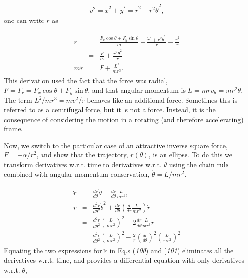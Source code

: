 \documentclass[letterpaper,10pt,english]{sphinxmanual}
\begin{document}
\begin{equation*}
\begin{split}
\begin{equation}
v^2=\dot{x}^2+\dot{y}^2=\dot{r}^2+r^2\dot{\theta}^2,
\label{_auto74} \tag{99}
\end{equation}
\end{split}
\end{equation*}
one can write \(\ddot{r}\) as




\begin{equation*}
\begin{split}
\begin{eqnarray}
\label{eq:radialeqofmotion2} \tag{100}
\ddot{r}&=&\frac{F_x\cos\theta+F_y\sin\theta}{m}+\frac{\dot{r}^2+r^2\dot{\theta}^2}{r}-\frac{\dot{r}^2}{r}\\
\nonumber
&=&\frac{F}{m}+\frac{r^2\dot{\theta}^2}{r}\\
\nonumber
m\ddot{r}&=&F+\frac{L^2}{mr^3}.
\end{eqnarray}
\end{split}
\end{equation*}
This derivation used the fact that the force was radial,
\(F=F_r=F_x\cos\theta+F_y\sin\theta\), and that angular momentum is
\(L=mrv_{\theta}=mr^2\dot{\theta}\). The term \(L^2/mr^3=mv^2/r\) behaves
like an additional force. Sometimes this is referred to as a
centrifugal force, but it is not a force. Instead, it is the
consequence of considering the motion in a rotating (and therefore
accelerating) frame.

Now, we switch to the particular case of an attractive inverse square
force, \(F=-\alpha/r^2\), and show that the trajectory, \(r(\theta)\), is
an ellipse. To do this we transform derivatives w.r.t. time to
derivatives w.r.t. \(\theta\) using the chain rule combined with angular
momentum conservation, \(\dot{\theta}=L/mr^2\).




\begin{equation*}
\begin{split}
\begin{eqnarray}
\label{eq:rtotheta} \tag{101}
\dot{r}&=&\frac{dr}{d\theta}\dot{\theta}=\frac{dr}{d\theta}\frac{L}{mr^2},\\
\nonumber
\ddot{r}&=&\frac{d^2r}{d\theta^2}\dot{\theta}^2
+\frac{dr}{d\theta}\left(\frac{d}{dr}\frac{L}{mr^2}\right)\dot{r}\\
\nonumber
&=&\frac{d^2r}{d\theta^2}\left(\frac{L}{mr^2}\right)^2
-2\frac{dr}{d\theta}\frac{L}{mr^3}\dot{r}\\
\nonumber
&=&\frac{d^2r}{d\theta^2}\left(\frac{L}{mr^2}\right)^2
-\frac{2}{r}\left(\frac{dr}{d\theta}\right)^2\left(\frac{L}{mr^2}\right)^2
\end{eqnarray}
\end{split}
\end{equation*}
Equating the two expressions for \(\ddot{r}\) in Eq.s ({\hyperref[\detokenize{chapter1:eq:radialeqofmotion2}]{\emph{100}}}) and ({\hyperref[\detokenize{chapter1:eq:rtotheta}]{\emph{101}}}) eliminates all the derivatives w.r.t. time, and provides a differential equation with only derivatives w.r.t. \(\theta\),
\end{document}
